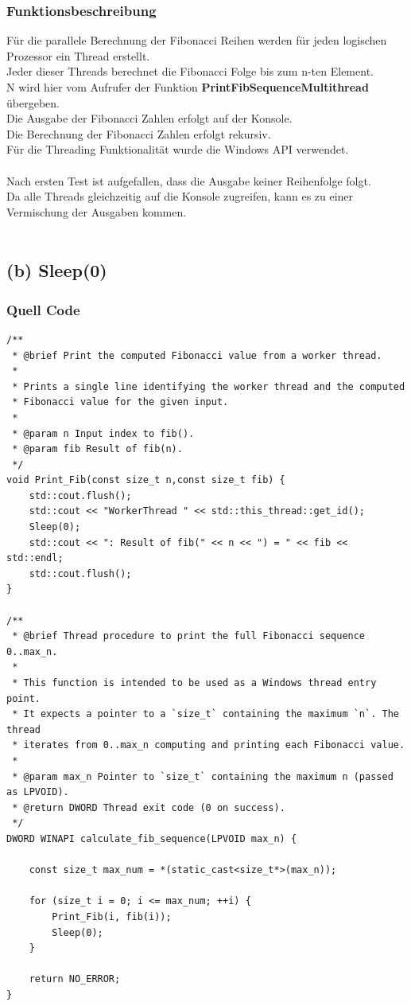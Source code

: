 \documentclass[a4paper,12pt]{article}
\begin{document}
\subsubsection{Funktionsbeschreibung}
Für die parallele Berechnung der Fibonacci Reihen werden für jeden logischen Prozessor ein Thread erstellt.\\
Jeder dieser Threads berechnet die Fibonacci Folge bis zum n-ten Element.\\
N wird hier vom Aufrufer der Funktion \textbf{PrintFibSequenceMultithread} übergeben.\\
Die Ausgabe der Fibonacci Zahlen erfolgt auf der Konsole.\\
Die Berechnung der Fibonacci Zahlen erfolgt rekursiv.\\
Für die Threading Funktionalität wurde die Windows API verwendet.\\
\\
Nach ersten Test ist aufgefallen, dass die Ausgabe keiner Reihenfolge folgt.\\
Da alle Threads gleichzeitig auf die Konsole zugreifen, kann es zu einer Vermischung der Ausgaben kommen.\\
\\
\newpage
\subsection{(b) Sleep(0)}
\subsubsection{Quell Code}
\begin{lstlisting}[style=cppstyle]
/**
 * @brief Print the computed Fibonacci value from a worker thread.
 *
 * Prints a single line identifying the worker thread and the computed
 * Fibonacci value for the given input.
 *
 * @param n Input index to fib().
 * @param fib Result of fib(n).
 */
void Print_Fib(const size_t n,const size_t fib) {
	std::cout.flush();
	std::cout << "WorkerThread " << std::this_thread::get_id();
	Sleep(0);
	std::cout << ": Result of fib(" << n << ") = " << fib << std::endl;
	std::cout.flush();
}

/**
 * @brief Thread procedure to print the full Fibonacci sequence 0..max_n.
 *
 * This function is intended to be used as a Windows thread entry point.
 * It expects a pointer to a `size_t` containing the maximum `n`. The thread
 * iterates from 0..max_n computing and printing each Fibonacci value.
 *
 * @param max_n Pointer to `size_t` containing the maximum n (passed as LPVOID).
 * @return DWORD Thread exit code (0 on success).
 */
DWORD WINAPI calculate_fib_sequence(LPVOID max_n) {

	const size_t max_num = *(static_cast<size_t*>(max_n));

	for (size_t i = 0; i <= max_num; ++i) {
		Print_Fib(i, fib(i));
		Sleep(0);
	}

	return NO_ERROR;
}
\end{lstlisting}
\end{document}

